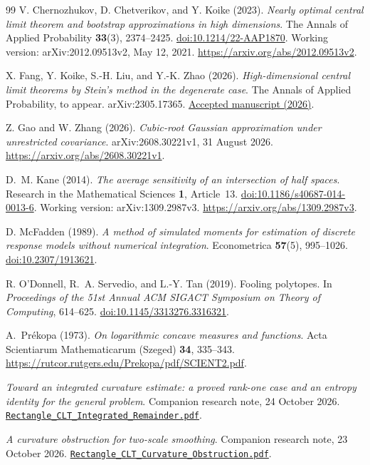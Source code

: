 \documentclass[11pt,letterpaper]{article}
\newif\ifshowpolish
\newcommand{\polish}[1]{\ifshowpolish{\color{magenta}%
\hypersetup{linkcolor=magenta,citecolor=magenta,urlcolor=magenta}#1}\else#1\fi}
\newif\ifshowrev
\newcommand{\rev}[1]{\ifshowrev{\color{revblue}%
\hypersetup{linkcolor=revblue,citecolor=revblue,urlcolor=revblue}#1}\else#1\fi}
\newif\ifshowskill
\newcommand{\skl}[1]{\ifshowskill{\color{revblue}%
\hypersetup{linkcolor=revblue,citecolor=revblue,urlcolor=revblue}#1}\else#1\fi}
\theoremstyle{remark}
\begin{document}
\begin{thebibliography}{99}
V. Chernozhukov, D. Chetverikov, and Y. Koike (2023).
\emph{Nearly optimal central limit theorem and bootstrap approximations
in high dimensions}.
The Annals of Applied Probability \textbf{33}(3), 2374--2425.
\href{https://doi.org/10.1214/22-AAP1870}{doi:10.1214/22-AAP1870}.
Working version: arXiv:2012.09513v2, May 12, 2021.
\url{https://arxiv.org/abs/2012.09513v2}.

X. Fang, Y. Koike, S.-H. Liu, and Y.-K. Zhao (2026).
\emph{High-dimensional central limit theorems by Stein's method in
the degenerate case}. The Annals of Applied Probability, to appear.
\skl{arXiv:2305.17365.}
\href{https://research.cuhk.edu.hk/en/publications/high-dimensional-central-limit-theorems-by-steins-method-in-the-d/}{Accepted manuscript (2026)}.

Z. Gao and W. Zhang (2026).
\emph{Cubic-root Gaussian approximation under unrestricted covariance}.
arXiv:2608.30221v1, 31 August 2026.
\url{https://arxiv.org/abs/2608.30221v1}.

\polish{D.~M. Kane (2014).
\emph{The average sensitivity of an intersection of half spaces}.
Research in the Mathematical Sciences \textbf{1}, Article~13.
\href{https://doi.org/10.1186/s40687-014-0013-6}{doi:10.1186/s40687-014-0013-6}.
Working version: arXiv:1309.2987v3.
\url{https://arxiv.org/abs/1309.2987v3}.}

D. McFadden (1989).
\emph{A method of simulated moments for estimation of discrete
response models without numerical integration}.
Econometrica \textbf{57}(5), 995--1026.
\href{https://doi.org/10.2307/1913621}{doi:10.2307/1913621}.

R. O'Donnell, R.~A. Servedio, and L.-Y. Tan (2019).
Fooling polytopes.
In \emph{Proceedings of the 51st Annual ACM SIGACT Symposium on
Theory of Computing}, 614--625.
\href{https://doi.org/10.1145/3313276.3316321}{doi:10.1145/3313276.3316321}.

\polish{A.~Pr\'ekopa (1973).
\emph{On logarithmic concave measures and functions}.
Acta Scientiarum Mathematicarum (Szeged) \textbf{34}, 335--343.
\url{https://rutcor.rutgers.edu/Prekopa/pdf/SCIENT2.pdf}.}

\rev{\emph{Toward an integrated curvature estimate: a proved rank-one case
and an entropy identity for the general problem}.
Companion research note, 24 October 2026.
\href{https://github.com/VC2015/HDCLTs/blob/main/research-rectangle-clt-singular/Rectangle_CLT_Integrated_Remainder.pdf}{\nolinkurl{Rectangle_CLT_Integrated_Remainder.pdf}}.}

\rev{\emph{A curvature obstruction for two-scale smoothing}.
Companion research note, 23 October 2026.
\href{https://github.com/VC2015/HDCLTs/blob/main/research-rectangle-clt-singular/Rectangle_CLT_Curvature_Obstruction.pdf}{\nolinkurl{Rectangle_CLT_Curvature_Obstruction.pdf}}.}

\end{thebibliography}
\end{document}
